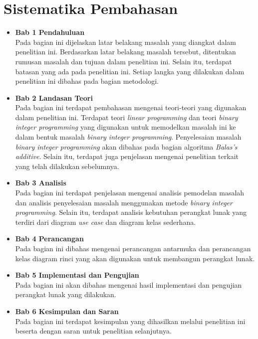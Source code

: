 \section{Sistematika Pembahasan}
\label{sec:sispem}
\begin{itemize}
	\item \textbf{Bab 1 Pendahuluan}\\
	Pada bagian ini dijelaskan latar belakang masalah yang diangkat dalam penelitian ini. Berdasarkan latar belakang masalah tersebut, ditentukan rumusan masalah dan tujuan dalam penelitian ini. Selain itu, terdapat batasan yang ada pada penelitian ini. Setiap langka yang dilakukan dalam penelitian ini dibahas pada bagian metodologi.
	\item \textbf{Bab 2 Landasan Teori}\\
	Pada bagian ini terdapat pembahasan mengenai teori-teori yang digunakan dalam penelitian ini. Terdapat teori \textit{linear programming} dan teori \textit{binary integer programming} yang digunakan untuk memodelkan masalah ini ke dalam bentuk masalah \textit{binary integer programming}. Penyelesaian masalah \textit{binary integer programming} akan dibahas pada bagian algoritma \textit{Balas's additive}. Selain itu, terdapat juga penjelasan mengenai penelitian terkait yang telah dilakukan sebelumnya.
	\item \textbf{Bab 3 Analisis}\\
	Pada bagian ini terdapat penjelasan mengenai analisis pemodelan masalah dan analisis penyelesaian masalah menggunakan metode \textit{binary integer programming}. Selain itu, terdapat analisis kebutuhan perangkat lunak yang terdiri dari diagram \textit{use case} dan diagram kelas sederhana.
	\item \textbf{Bab 4 Perancangan}\\
	Pada bagian ini dibahas mengenai perancangan antarmuka dan perancangan kelas diagram rinci yang akan digunakan untuk membangun perangkat lunak.
	\item \textbf{Bab 5 Implementasi dan Pengujian}\\
	Pada bagian ini akan dibahas mengenai hasil implementasi dan pengujian perangkat lunak yang dilakukan.
	\item \textbf{Bab 6 Kesimpulan dan Saran}\\
	Pada bagian ini terdapat kesimpulan yang dihasilkan melalui penelitian ini beserta dengan saran untuk penelitian selanjutnya.
\end{itemize}